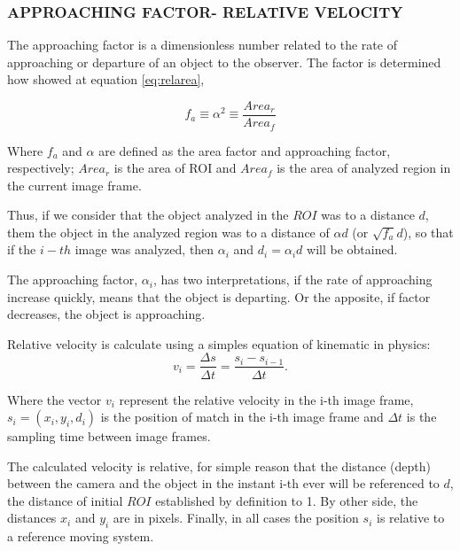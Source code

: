
\subsubsection{APPROACHING FACTOR- RELATIVE VELOCITY}
The approaching factor is a dimensionless number related to the rate of approaching 
or departure of an object to the observer. The factor
is determined how showed at equation \ref{eq:relarea},

\begin{equation}\label{eq:relarea}
f_a \equiv \alpha^2 \equiv \frac{Area_r}{Area_f} 
\end{equation}

Where $f_a$ and $\alpha$ are defined as the area factor and approaching factor, 
respectively; $Area_r$ is the area of ROI and $Area_f$ 
is the area of analyzed region in the current image frame. 

Thus, if we consider that the object analyzed in the $ROI$ was to a distance $d$,
them the object in the analyzed region was to a distance of $\alpha d$ (or $\sqrt{f_a} d$),
so that if the $i-th$ image was analyzed, then $\alpha_i$ and $d_i=\alpha_i d$ will be obtained.

The approaching factor, $\alpha_i$, has two interpretations, if the rate of approaching increase quickly, 
means that the object is departing. Or the apposite, if factor decreases, the 
object is approaching.

Relative velocity is calculate using a simples equation of kinematic in physics:
\begin{equation}
 v_i = \frac{\Delta s}{\Delta t}= \frac{s_i-s_{i-1}}{\Delta t}.
\end{equation}

Where the vector $v_i$ represent the relative velocity in the i-th image frame, 
$s_i=(x_i,y_i,d_i)$ is the position of match in the i-th image frame
and $\Delta t$ is the sampling time between image frames.

The calculated velocity  is relative, for simple reason that the distance (depth) between the 
camera and the object in the instant i-th ever will be referenced to $d$, the distance of
initial $ROI$ established by definition to 1. By other side, the distances $x_i$ and $y_i$ are in pixels. 
Finally, in all cases the position $s_i$ is relative to a reference moving system.

